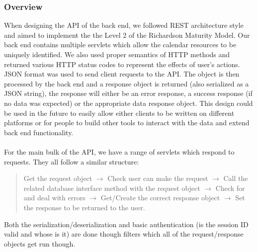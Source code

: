 \documentclass[10pt,a4paper]{article}
\begin{document}
\subsubsection{Overview}
When designing the API of the back end, we followed REST architecture style and 
aimed to implement the the Level 2 of the Richardson Maturity Model. Our back 
end contains multiple servlets which allow the calendar resources to be uniquely 
identified. We also used proper semantics of HTTP methods and returned various 
HTTP status codes to represent the effects of user's actions. JSON format was 
used to send client requests to the API. The object is then processed by the 
back end and a response object is returned (also serialized as a JSON string), 
the response will either be an error response, a success response (if no data 
was expected) or the appropriate data response object. This design could be used 
in the future to easily allow either clients to be written on different 
platforms or for people to build other tools to interact with the data and 
extend back end functionality. 
\\
\\
\noindent For the main bulk of the API, we have a range of servlets which 
respond to requests. They all follow a similar structure:
\begin{quote}
\centering
Get the request object $\rightarrow$ Check user can make the request 
$\rightarrow$ Call the related database interface method with the request object 
$\rightarrow$ Check for and deal with errors $\rightarrow$ Get/Create the 
correct response object $\rightarrow$ Set the response to be returned to the 
user.
\end{quote}
Both the serialization/deserialization and basic authentication (is the session 
ID valid and whose is it) are done though filters which all of the 
request/response objects get run though.
\end{document}
